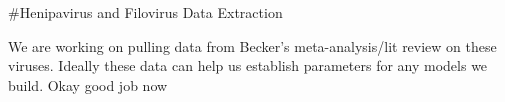 #Henipavirus and Filovirus Data Extraction

We are working on pulling data from Becker's meta-analysis/lit review on these viruses. Ideally these data can help us establish parameters for any models we build. Okay good job now

